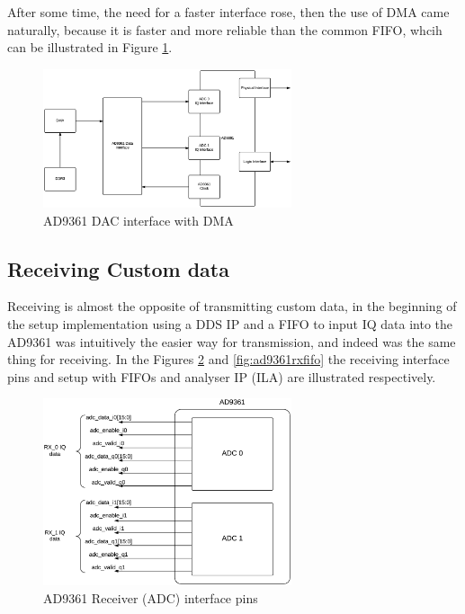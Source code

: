  After some time, the need for a faster interface rose, then the use of DMA
came naturally, because it is faster and more reliable than the common FIFO,
whcih can be illustrated in Figure \ref{fig:ad9361txdma}.

\begin{figure}[htbp]
    \centering
    \includegraphics[width=0.65\textwidth]{./figures/dac_dma}
    \caption{ AD9361 DAC interface with DMA
    \label{fig:ad9361txdma}}
\end{figure}

\subsection{Receiving Custom data}

Receiving is almost the opposite of transmitting custom data, in the beginning
of the setup implementation using a DDS IP and a FIFO to input IQ data into the
AD9361 was intuitively the easier way for transmission, and indeed was the same
thing for receiving. In the Figures \ref{fig:rxpins} and \ref{fig:ad9361rxfifo}
the receiving interface pins and setup with FIFOs and analyser IP (ILA) are
illustrated respectively.

\begin{figure}[htbp]
    \centering
    \includegraphics[width=0.65\textwidth]{./figures/ad9361rx_pins}
    \caption{ AD9361 Receiver (ADC) interface pins
    \label{fig:rxpins}}
\end{figure}

